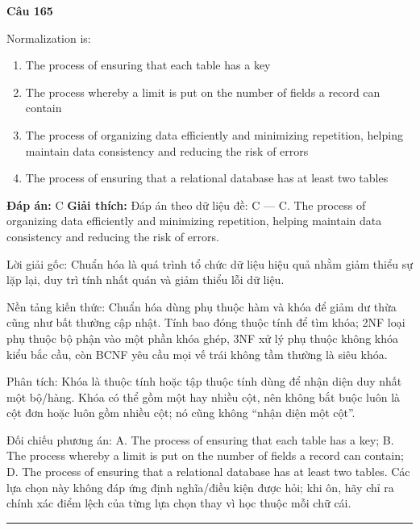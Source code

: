 \documentclass[11pt,a4paper]{article}
\newenvironment{question}[1]{%
  \par\vspace{1em}\noindent\textbf{\large Câu #1}\par\vspace{0.4em}
}{%
  \par\vspace{1em}\hrule\vspace{0.6em}
}
\newenvironment{choices}{%
  \begin{enumerate}[label=\textbf{\Alph*.},leftmargin=2.2em,itemsep=2pt,topsep=3pt]
}{%
  \end{enumerate}
}
\newcommand{\choice}{\item}
\begin{document}
\begin{question}{165}
Normalization is:
\begin{choices}
\choice The process of ensuring that each table has a key
\choice The process whereby a limit is put on the number of fields a record can contain
\choice The process of organizing data efficiently and minimizing repetition, helping maintain data consistency and reducing the risk of errors
\choice The process of ensuring that a relational database has at least two tables
\end{choices}
\textbf{Đáp án:} C
\textbf{Giải thích:} Đáp án theo dữ liệu đề: C — C. The process of organizing data efficiently and minimizing repetition, helping maintain data consistency and reducing the risk of errors.

Lời giải gốc: Chuẩn hóa là quá trình tổ chức dữ liệu hiệu quả nhằm giảm thiểu sự lặp lại, duy trì tính nhất quán và giảm thiểu lỗi dữ liệu.

Nền tảng kiến thức: Chuẩn hóa dùng phụ thuộc hàm và khóa để giảm dư thừa cũng như bất thường cập nhật. Tính bao đóng thuộc tính để tìm khóa; 2NF loại phụ thuộc bộ phận vào một phần khóa ghép, 3NF xử lý phụ thuộc không khóa kiểu bắc cầu, còn BCNF yêu cầu mọi vế trái không tầm thường là siêu khóa.

Phân tích: Khóa là thuộc tính hoặc tập thuộc tính dùng để nhận diện duy nhất một bộ/hàng. Khóa có thể gồm một hay nhiều cột, nên không bắt buộc luôn là cột đơn hoặc luôn gồm nhiều cột; nó cũng không “nhận diện một cột”.

Đối chiếu phương án: A. The process of ensuring that each table has a key; B. The process whereby a limit is put on the number of fields a record can contain; D. The process of ensuring that a relational database has at least two tables. Các lựa chọn này không đáp ứng định nghĩa/điều kiện được hỏi; khi ôn, hãy chỉ ra chính xác điểm lệch của từng lựa chọn thay vì học thuộc mỗi chữ cái.
\end{question}
\end{document}
